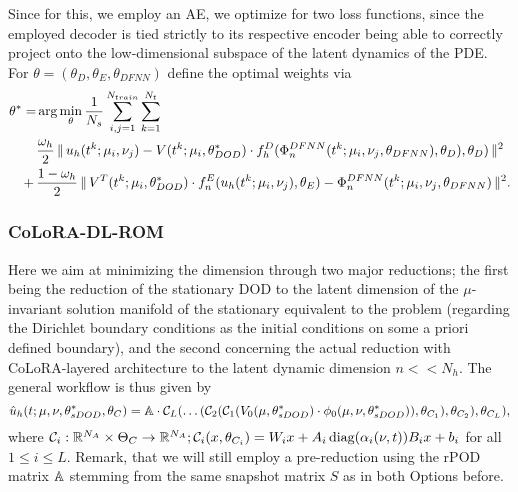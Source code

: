 Since for this, we employ an AE, we optimize for two loss functions, since the employed decoder is tied strictly to its respective encoder being able to correctly project onto the low-dimensional subspace of the latent dynamics of the PDE. For $\theta = (\theta_D, \theta_E, \theta_{DFNN})$ define the optimal weights via
\begin{align*}
    \theta^* = &\operatorname{arg}\min_\theta \frac{1}{N_s} \sum_{i, j = 1}^{N_{train}} \sum_{k = 1}^{N_t} \\
    &\frac{\omega_h}{2} \, \lVert \, u_h(t^k; \mu_i, \nu_j) - V(t^k; \mu_i, \theta_{DOD}^*) \cdot f^D_h(\Phi_n^{DFNN}(t^k; \mu_i, \nu_j, \theta_{DFNN}), \theta_D), \theta_{D}) \, \rVert^2 \\
    + \, &\frac{1 - \omega_h}{2} \, \lVert \, V^T(t^k; \mu_i, \theta_{DOD}^*) \cdot f^E_n(u_h(t^k; \mu_i, \nu_j), \theta_E) - \Phi_n^{DFNN}(t^k; \mu_i, \nu_j, \theta_{DFNN}) \, \rVert^2.
\end{align*}

\subsubsection{CoLoRA-DL-ROM}


Here we aim at minimizing the dimension through two major reductions; the first being the reduction of the stationary DOD to the latent dimension of the $\mu$-invariant solution manifold of the stationary equivalent to the problem (regarding the Dirichlet boundary conditions as the initial conditions on some a priori defined boundary), and the second concerning the actual reduction with CoLoRA-layered architecture to the latent dynamic dimension $n << N_h$. The general workflow is thus given by 
\begin{equation}
    \hat{u}_h(t; \mu, \nu, \theta^*_{sDOD}, \theta_{C}) = \mathbb{A} \cdot \mathcal{C}_L( \dots (\mathcal{C}_2(\mathcal{C}_1(V_0(\mu, \theta^*_{sDOD}) \cdot \phi_0(\mu, \nu, \theta^*_{sDOD})), \theta_{C_1}), \theta_{C_2}), \theta_{C_L}),
\end{equation}
where $\mathcal{C}_i: \mathbb{R}^{N_A} \times \Theta_C \to \mathbb{R}^{N_A}; \mathcal{C}_i(x, \theta_{C_i}) = W_i x + A_i \, \text{diag}(\alpha_i(\nu, t)) B_i x + b_i$ for all $1 \leq i \leq L.$
Remark, that we will still employ a pre-reduction using the rPOD matrix $\mathbb{A}$ stemming from the same snapshot matrix $S$ as in both Options before.
